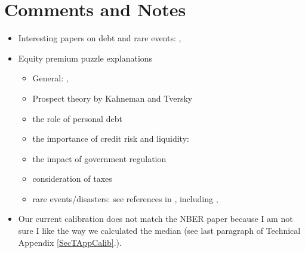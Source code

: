 \documentclass[letterpaper,12pt]{article}
\theoremstyle{definition}
\begin{document}
\newpage
\section{Comments and Notes}\label{TAppCommentsNotes}

\begin{itemize}
  \item Interesting papers on debt and rare events: \citet{RebeloEtAl:2019}, \citet{ReinhartEtAl:2015}
  \item Equity premium puzzle explanations
  \begin{itemize}
    \item General: \citet{DeLongMagin:2009}, \citet{FarhiGourio:2019}
    \item Prospect theory by Kahneman and Tversky
    \item the role of personal debt
    \item the importance of credit risk and liquidity: \citet{Gourio:2013}
    \item the impact of government regulation
    \item consideration of taxes
    \item rare events/disasters: see references in \citet{TsaiWachter:2015}, including \citet{Barro:2009}, \citet{Gourio:2012}
  \end{itemize}
  \item Our current calibration does not match the NBER paper because I am not sure I like the way we calculated the median (see last paragraph of Technical Appendix \ref{SecTAppCalib}.).

\end{itemize}
\end{document}
